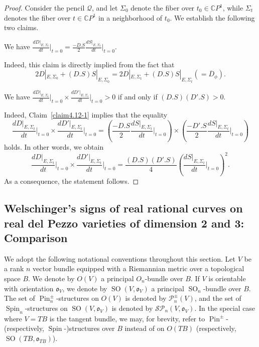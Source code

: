 \documentclass[11pt]{amsart}
\numberwithin{equation}{section}
\theoremstyle{definition}
\theoremstyle{plain}
\theoremstyle{remark}
\newenvironment{claim}[1]{\renewcommand\theinnercustomclaim{#1}\innercustomclaim}{\endinnercustomclaim}
\DeclareMathOperator{\SO}{SO}
\DeclareMathOperator{\Pin}{Pin}
\DeclareMathOperator{\Spin}{Spin}
\begin{document}
\begin{proof}
Consider the pencil $\mathcal{Q}$, and let $\Sigma_0$ denote the fiber over $t_0 \in \mathbb{C}P^1$, while $\Sigma_t$ denotes the fiber over $t \in \mathbb{C}P^1$ in a neighborhood of $t_0$. We establish the following two claims.

\begin{claim}{1}\label{claim4.12-1}
We have  $\frac{dD|_{E,\Sigma_t}}{dt}\Big|_{t=0}=\frac{-D.S}{2}\frac{dS|_{E,\Sigma_t}}{dt}\Big|_{t=0}.$
  \end{claim}

Indeed, this claim is directly implied from the fact that 
$$2D|_{E,\Sigma_0}+(D.S)S|_{E,\Sigma_0}=2D|_{E,\Sigma_t}+(D.S)S|_{E,\Sigma_t}(=\overline{D}_{\phi}).$$

\begin{claim}{2}\label{claim4.12-2}
We have $\frac{dD|_{E,\Sigma_t}}{dt}\Big|_{t=0}\times \frac{dD'|_{E,\Sigma_t}}{dt}\Big|_{t=0}>0$ if and only if $(D.S)(D'.S)>0$.
\end{claim}
  
Indeed, Claim~\ref{claim4.12-1} implies that the  equality 
$$\frac{dD|_{E,\Sigma_t}}{dt}\Big|_{t=0}\times \frac{dD'|_{E,\Sigma_t}}{dt}\Big|_{t=0}= \left( \frac{-D.S}{2}\frac{dS|_{E,\Sigma_t}}{dt}\Big|_{t=0}\right)\times \left( \frac{-D'.S}{2}\frac{dS|_{E,\Sigma_t}}{dt}\Big|_{t=0}\right)$$
holds. In other words, we obtain
$$\frac{dD|_{E,\Sigma_t}}{dt}\Big|_{t=0}\times \frac{dD'|_{E,\Sigma_t}}{dt}\Big|_{t=0}= \frac{(D.S)(D'.S)}{4}\left(\frac{dS|_{E,\Sigma_t}}{dt}\Big|_{t=0}\right)^2.$$
As a consequence, the statement follows.
\end{proof}

\subsection{Welschinger's signs of real rational curves on real del Pezzo varieties of dimension 2 and 3: Comparison} \label{Sect-signs.in.comparison}
We adopt the following notational conventions throughout this section. Let $V$ be a rank $n$ vector bundle equipped with a Riemannian metric over a topological space $B$. We denote by $O(V)$ a principal $O_n$-bundle over $B$. If $V$ is orientable with orientation $\mathfrak{o}_V$, we denote by  $\SO(V,\mathfrak{o}_{V})$  a principal $\SO_n$-bundle over $B$. The set of $\Pin^\pm_n$-structures on $O(V)$ is denoted by $\mathcal{P}_n^\pm(V)$, and  the set of $\Spin_n$-structures on $\SO(V,\mathfrak{o}_V)$ is denoted by $\mathcal{SP}_n(V,\mathfrak{o}_V)$. In the special case where $V = TB$ is the tangent bundle, we may, for brevity, refer to $\Pin^\pm$- (respectively, $\Spin$-)structures over $B$ instead of on $O(TB)$ (respectively, $\SO(TB, \mathfrak{o}_{TB})$).
\end{document}
